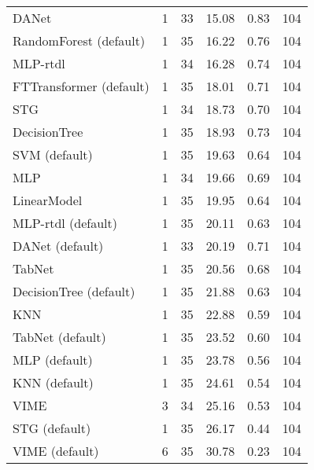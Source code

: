 \begin{tabular}{lrrrrr}
DANet                   &                  1 &  33 &  15.08 &                           0.83 &   104 \\
RandomForest (default)  &                  1 &  35 &  16.22 &                           0.76 &   104 \\
MLP-rtdl                &                  1 &  34 &  16.28 &                           0.74 &   104 \\
FTTransformer (default) &                  1 &  35 &  18.01 &                           0.71 &   104 \\
STG                     &                  1 &  34 &  18.73 &                           0.70 &   104 \\
DecisionTree            &                  1 &  35 &  18.93 &                           0.73 &   104 \\
SVM (default)           &                  1 &  35 &  19.63 &                           0.64 &   104 \\
MLP                     &                  1 &  34 &  19.66 &                           0.69 &   104 \\
LinearModel             &                  1 &  35 &  19.95 &                           0.64 &   104 \\
MLP-rtdl (default)      &                  1 &  35 &  20.11 &                           0.63 &   104 \\
DANet (default)         &                  1 &  33 &  20.19 &                           0.71 &   104 \\
TabNet                  &                  1 &  35 &  20.56 &                           0.68 &   104 \\
DecisionTree (default)  &                  1 &  35 &  21.88 &                           0.63 &   104 \\
KNN                     &                  1 &  35 &  22.88 &                           0.59 &   104 \\
TabNet (default)        &                  1 &  35 &  23.52 &                           0.60 &   104 \\
MLP (default)           &                  1 &  35 &  23.78 &                           0.56 &   104 \\
KNN (default)           &                  1 &  35 &  24.61 &                           0.54 &   104 \\
VIME                    &                  3 &  34 &  25.16 &                           0.53 &   104 \\
STG (default)           &                  1 &  35 &  26.17 &                           0.44 &   104 \\
VIME (default)          &                  6 &  35 &  30.78 &                           0.23 &   104 \\
\bottomrule
\end{tabular}
